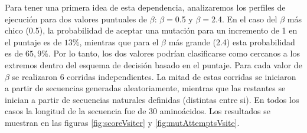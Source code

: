 Para tener una primera idea de esta dependencia, analizaremos los perfiles de ejecución para dos valores puntuales de $\beta$: $\beta=$0.5 y $\beta=$2.4.
En el caso del $\beta$ más chico (0.5), la probabilidad de aceptar una mutación para un incremento de 1 en el puntaje es de $13\%$, mientras que para el $\beta$ más grande (2.4) esta probabilidad es de $65,9\%$.
Por lo tanto, los dos valores podrían clasificarse como cercanos a los extremos dentro del esquema de decisión basado en el puntaje.
Para cada valor de $\beta$ se realizaron 6 corridas independientes.
La mitad de estas corridas se iniciaron a partir de secuencias generadas aleatoriamente, mientras que las restantes se inician a partir de secuencias naturales definidas (distintas entre si).
En todos los casos la longitud de la secuencia fue de 30 aminoácidos. Los resultados se muestran en las figuras \ref{fig:scoreVsiter} y \ref{fig:mutAttemptsVsite}.




% 
% 

